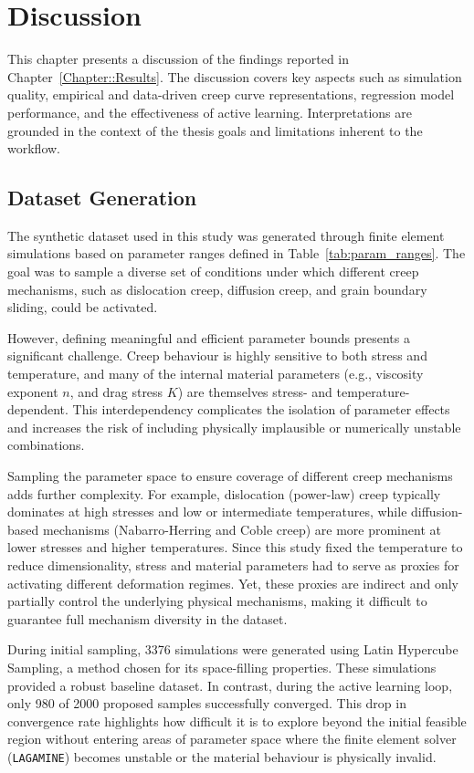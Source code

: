 \documentclass[class=scrbook, crop=false]{standalone}
\begin{document}
  
\chapter{Discussion}
\label{Chapter::Discussion}

This chapter presents a discussion of the findings reported in Chapter~\ref{Chapter::Results}. The discussion covers key aspects such as simulation quality, empirical and data-driven creep curve representations, regression model performance, and the effectiveness of active learning. Interpretations are grounded in the context of the thesis goals and limitations inherent to the workflow.

\section{Dataset Generation}

The synthetic dataset used in this study was generated through finite element simulations based on parameter ranges defined in Table~\ref{tab:param_ranges}. The goal was to sample a diverse set of conditions under which different creep mechanisms, such as dislocation creep, diffusion creep, and grain boundary sliding, could be activated.

However, defining meaningful and efficient parameter bounds presents a significant challenge. Creep behaviour is highly sensitive to both stress and temperature, and many of the internal material parameters (e.g., viscosity exponent $n$, and drag stress $K$) are themselves stress- and temperature-dependent. This interdependency complicates the isolation of parameter effects and increases the risk of including physically implausible or numerically unstable combinations.

Sampling the parameter space to ensure coverage of different creep mechanisms adds further complexity. For example, dislocation (power-law) creep typically dominates at high stresses and low or intermediate temperatures, while diffusion-based mechanisms (Nabarro-Herring and Coble creep) are more prominent at lower stresses and higher temperatures. Since this study fixed the temperature to reduce dimensionality, stress and material parameters had to serve as proxies for activating different deformation regimes. Yet, these proxies are indirect and only partially control the underlying physical mechanisms, making it difficult to guarantee full mechanism diversity in the dataset.

During initial sampling, 3376 simulations were generated using Latin Hypercube Sampling, a method chosen for its space-filling properties. These simulations provided a robust baseline dataset. In contrast, during the active learning loop, only 980 of 2000 proposed samples successfully converged. This drop in convergence rate highlights how difficult it is to explore beyond the initial feasible region without entering areas of parameter space where the finite element solver (\texttt{LAGAMINE}) becomes unstable or the material behaviour is physically invalid.
\end{document}
